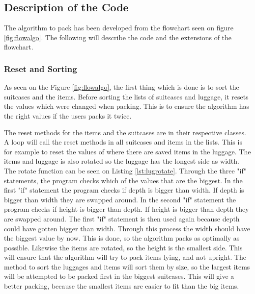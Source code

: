 \subsection{Description of the Code}
The algorithm to pack has been developed from the flowchart seen on figure \ref{fig:flowalgo}. The following will describe the code and the extensions of the flowchart.
\subsubsection{Reset and Sorting}
As seen on the Figure \ref{fig:flowalgo}, the first thing which is done is to sort the suitcases and the items. Before sorting the lists of suitcases and luggage, it resets the values which were changed when packing. This is to ensure the algorithm has the right values if the users packs it twice.

The reset methods for the items and the suitcases are in their respective classes. A loop will call the reset methods in all suitcases and items in the lists. This is for example to reset the values of where there are saved items in the luggage. The items and luggage is also rotated so the luggage has the longest side as width. The rotate function can be seen on Listing \ref{lst:lugrotate}. Through the three "if" statements, the program checks which of the values that are the biggest.
In the first "if" statement the program checks if depth is bigger than width. If depth is bigger than width they are swapped around. In the second "if" statement the program checks if height is bigger than depth. If height is bigger than depth they are swapped around. The first "if" statement is then used again because depth could have gotten bigger than width. Through this process the width should have the biggest value by now.
This is done, so the algorithm packs as optimally as possible. Likewise the items are rotated, so the height is the smallest side. This will ensure that the algorithm will try to pack items lying, and not upright.
The method to sort the luggages and items will sort them by size, so the largest items will be attempted to be packed first in the biggest suitcases. This will give a better packing, because the smallest items are easier to fit than the big items.

